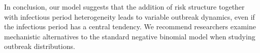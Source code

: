\documentclass{imammb}
\numberwithin{equation}{section}
\begin{document}
In conclusion, our model suggests that the addition of risk structure together with infectious period heterogeneity leads to variable outbreak dynamics, even if the infectious period has a central tendency. We recommend researchers examine mechanistic alternatives to the standard negative binomial model when studying outbreak distributions. 


 






\newpage



\end{document}

